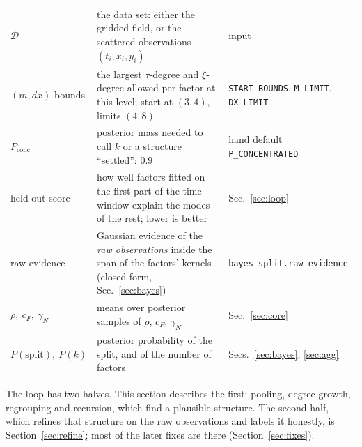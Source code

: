 \documentclass[11pt,a4paper]{article}
\theoremstyle{definition}
\begin{document}
\begin{symbols}
\begin{tabular}{@{}L{2.6cm}L{6.0cm}L{4.3cm}@{}}
$\mathcal D$ & the data set: either the gridded field, or the scattered observations $(t_i,x_i,y_i)$ & input\\
$(m,dx)$ bounds & the largest $\tau$-degree and $\xi$-degree allowed per factor at this level; start at $(3,4)$, limits $(4,8)$ & \texttt{START\_BOUNDS}, \texttt{M\_LIMIT}, \texttt{DX\_LIMIT}\\
$P_{\mathrm{conc}}$ & posterior mass needed to call $k$ or a structure ``settled'': $0.9$ & hand default \texttt{P\_CONCENTRATED}\\
held-out score & how well factors fitted on the first part of the time window explain the modes of the rest; lower is better & Sec.~\ref{sec:loop}\\
raw evidence & Gaussian evidence of the \emph{raw observations} inside the span of the factors' kernels (closed form, Sec.~\ref{sec:bayes}) & \texttt{bayes\_split.raw\_evidence}\\
$\bar\rho,\ \bar c_F,\ \bar\gamma_N$ & means over posterior samples of $\rho$, $c_F$, $\gamma_N$ & Sec.~\ref{sec:core}\\
$P(\text{split}),\ P(k)$ & posterior probability of the split, and of the number of factors & Secs.~\ref{sec:bayes}, \ref{sec:agg}\\
\end{tabular}
\end{symbols}

The loop has two halves. This section describes the first: pooling, degree growth, regrouping and recursion, which find a plausible structure. The second half, which refines that structure on the raw observations and labels it honestly, is Section~\ref{sec:refine}; most of the later fixes are there (Section~\ref{sec:fixes}).
\end{document}
